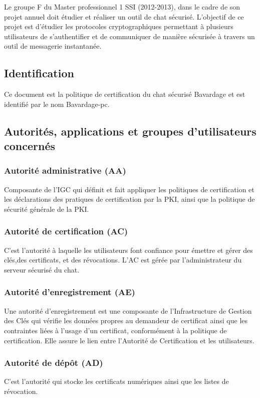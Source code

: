 \documentclass[a4paper,11pt,french]{article}
\begin{document}
Le groupe F du Master professionnel 1 SSI (2012-2013), dans le cadre de son projet annuel doit étudier et réaliser un outil de chat sécurisé. L'objectif de ce projet est d'étudier les protocoles cryptographiques permettant à plusieurs utilisateurs de s'authentifier et de communiquer de manière sécurisée à travers un outil de messagerie instantanée.


\subsection{ Identification }

Ce document est la politique de certification du chat sécurisé Bavardage et est identifié par le nom Bavardage-pc.


\subsection{ Autorités, applications et groupes d'utilisateurs concernés }
\subsubsection{Autorité administrative (AA)}

Composante de l'IGC qui définit et fait appliquer les politiques de certification et les déclarations des pratiques de certification par la PKI, ainsi que la politique de sécurité générale de la PKI.
	
\subsubsection{Autorité de certification (AC)}
C'est l'autorité à laquelle les utilisateurs font confiance pour émettre et gérer des clés,des certificats, et des révocations. L'AC est gérée par l'administrateur du serveur sécurisé du chat.


\subsubsection{Autorité d'enregistrement (AE)}

Une autorité d’enregistrement est une composante de l’Infrastructure de Gestion des Clés qui vérifie les données propres au demandeur de certificat ainsi que les contraintes liées à l’usage d’un certificat, conformément à la politique de certification. Elle assure le lien entre l'Autorité de Certification et les utilisateurs. 

\subsubsection{Autorité de dépôt (AD)}
C'est l'autorité qui stocke les certificats numériques ainsi que les listes de révocation.
\end{document}
